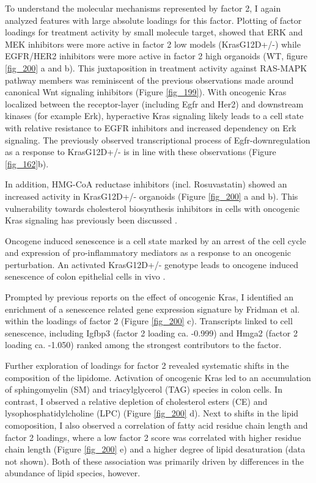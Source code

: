 \begin{flushleft}
\bigbreak
To understand the molecular mechanisms represented by factor 2, I again analyzed features with large absolute loadings for this factor. Plotting of factor loadings for treatment activity by small molecule target, showed that ERK and MEK inhibitors were more active in factor 2 low models (KrasG12D+/-) while EGFR/HER2 inhibitors were more active in factor 2 high organoids (WT, figure \ref{fig_200} a and b). This juxtaposition in treatment activity against RAS-MAPK pathway members was reminiscent of the previous observations made around canonical Wnt signaling inhibitors (Figure \ref{fig_199}). With oncogenic Kras localized between the receptor-layer (including Egfr and Her2) and downstream kinases (for example Erk), hyperactive Kras signaling likely leads to a cell state with relative resistance to EGFR inhibitors and increased dependency on Erk signaling. The previously observed transcriptional process of Egfr-downregulation as a response to KrasG12D+/- is in line with these observations (Figure \ref{fig_162}b).

\smallbreak

In addition, HMG-CoA reductase inhibitors (incl. Rosuvastatin) showed an increased activity in KrasG12D+/- organoids (Figure \ref{fig_200} a and b). This vulnerability towards cholesterol biosynthesis inhibitors in cells with oncogenic Kras signaling has previously been discussed \cite{Yu2018-he}. 

\smallbreak
Oncogene induced senescence is a cell state marked by an arrest of the cell cycle and expression of pro-inflammatory mediators as a response to an oncogenic perturbation. An activated KrasG12D+/- genotype leads to oncogene induced senescence of colon epithelial cells in vivo \cite{Bennecke2010-zf}. 

\smallbreak
Prompted by previous reports on the effect of oncogenic Kras, I identified an enrichment of a senescence related gene expression signature by Fridman et al. within the loadings of factor 2 
\cite{Fridman2008-ky} (Figure \ref{fig_200} c). Transcripts linked to cell senescence, including Igfbp3 (factor 2 loading ca. -0.999) and Hmga2 (factor 2 loading ca. -1.050) ranked among the strongest contributors to the factor. 

\smallbreak
Further exploration of loadings for factor 2 revealed systematic shifts in the composition of the lipidome. Activation of oncogenic Kras led to an accumulation of sphingomyelin (SM) and triacylglycerol (TAG) species in colon cells. In contrast, I observed a relative depletion of cholesterol esters (CE) and lysophosphatidylcholine (LPC) (Figure \ref{fig_200} d). Next to shifts in the lipid comoposition, I also observed a correlation of fatty acid residue chain length and factor 2 loadings, where a low factor 2 score was correlated with higher residue chain length (Figure \ref{fig_200} e) and a higher degree of lipid desaturation (data not shown). Both of these association was primarily driven by differences in the abundance of lipid species, however. 


\end{flushleft}
